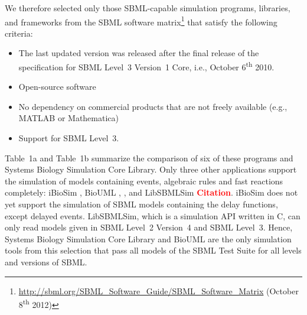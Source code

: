 \documentclass[10pt]{bmc_article}
\newenvironment{bmcformat}{\baselineskip20pt\sloppy\setboolean{publ}{false}}{\baselineskip20pt\sloppy}
\newcommand{\TODO}[1]{\textcolor{red}{\textbf{#1}}}
\begin{document}
\begin{bmcformat}
We therefore selected only those SBML-capable simulation programs, libraries, and frameworks from
the SBML software matrix\footnote{\url{http://sbml.org/SBML_Software_Guide/SBML_Software_Matrix} (October
8\textsuperscript{th} 2012)} that satisfy the following criteria:
\begin{itemize}
  \item The last updated version was released after the final release of
  the specification for SBML Level~3 Version~1 Core, i.e., October
  6\textsuperscript{th} 2010.
  \item Open-source software
  \item No dependency on commercial products that are not freely available
  (e.g., MATLAB\texttrademark{} or Mathematica\texttrademark)
  \item Support for SBML Level~3. 
\end{itemize}
Table~1a and Table~1b summarize the comparison of six of these programs and Systems Biology Simulation Core Library.
Only three other applications support the simulation of models containing events, algebraic rules and fast reactions completely: iBioSim \cite{Myers2009}, BioUML \cite{Kolpakov2011}, \cite{Kolpakov2006}, and LibSBMLSim \TODO{Citation}.
iBioSim does not yet support the simulation of SBML models containing the delay functions, except delayed events.
LibSBMLSim, which is a simulation API written in C, can only read models given in SBML Level~2 Version~4 and SBML Level~3.
Hence, Systems Biology Simulation Core Library and BioUML are the only simulation tools from this selection that pass all models of the SBML Test Suite for all levels and versions of SBML.


\end{bmcformat}
\end{document}
